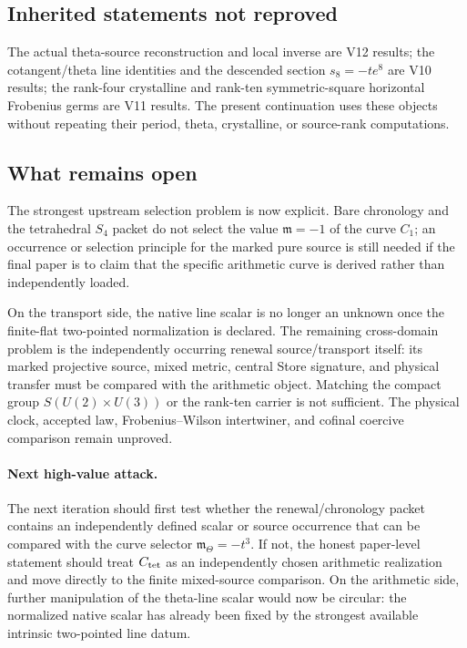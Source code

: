 \documentclass[11pt]{article}
\theoremstyle{definition}
\theoremstyle{remark}
\begin{document}
\subsection{Inherited statements not reproved}
The actual theta-source reconstruction and local inverse are V12 results; the
cotangent/theta line identities and the descended section $s_8=-t e^8$ are V10
results; the rank-four crystalline and rank-ten symmetric-square horizontal
Frobenius germs are V11 results.  The present continuation uses these objects
without repeating their period, theta, crystalline, or source-rank
computations.

\subsection{What remains open}
The strongest upstream selection problem is now explicit.  Bare chronology
and the tetrahedral $S_4$ packet do not select the value
$\mathfrak m=-1$ of the curve $C_1$; an occurrence or selection principle for
the marked pure source is still needed if the final paper is to claim that the
specific arithmetic curve is derived rather than independently loaded.

On the transport side, the native line scalar is no longer an unknown once the
finite-flat two-pointed normalization is declared.  The remaining cross-domain
problem is the independently occurring renewal source/transport itself: its
marked projective source, mixed metric, central Store signature, and physical
transfer must be compared with the arithmetic object.  Matching the compact
group $S(U(2)\times U(3))$ or the rank-ten carrier is not sufficient.
The physical clock, accepted law, Frobenius--Wilson intertwiner, and cofinal
coercive comparison remain unproved.

\paragraph{Next high-value attack.}
The next iteration should first test whether the renewal/chronology packet
contains an independently defined scalar or source occurrence that can be
compared with the curve selector $\mathfrak m_\Theta=-t^3$.  If not, the
honest paper-level statement should treat $C_{\rm tet}$ as an independently
chosen arithmetic realization and move directly to the finite mixed-source
comparison.  On the arithmetic side, further manipulation of the theta-line
scalar would now be circular: the normalized native scalar has already been
fixed by the strongest available intrinsic two-pointed line datum.
\end{document}

